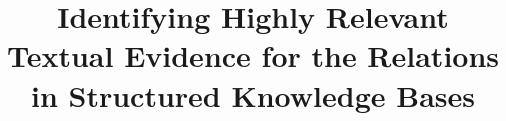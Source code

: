 \documentclass{sig-alternate}
\begin{document}
%
%
\title{Identifying Highly Relevant Textual Evidence for the Relations in Structured Knowledge Bases}




%
\author{
%
%
}
\end{document}
